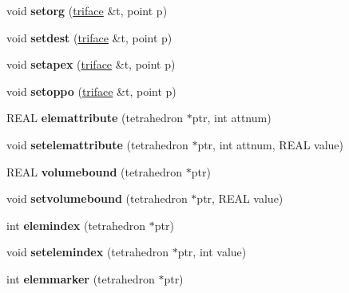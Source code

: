 \begin{DoxyCompactItemize}
void {\bfseries setorg} (\hyperlink{classtetgenmesh_1_1triface}{triface} \&t, point p)
\item 
\mbox{\label{classtetgenmesh_a0fe745e12c7d0ce253a8d4486992ed7e}} 
void {\bfseries setdest} (\hyperlink{classtetgenmesh_1_1triface}{triface} \&t, point p)
\item 
\mbox{\label{classtetgenmesh_a0f00b784db4aba3d5d3f7c7b09ed12dc}} 
void {\bfseries setapex} (\hyperlink{classtetgenmesh_1_1triface}{triface} \&t, point p)
\item 
\mbox{\label{classtetgenmesh_abb76d76639d4f8cedc41c86d6fa2f180}} 
void {\bfseries setoppo} (\hyperlink{classtetgenmesh_1_1triface}{triface} \&t, point p)
\item 
\mbox{\label{classtetgenmesh_abffbd551714f2e119e0f8ba3e4e54c92}} 
R\+E\+AL {\bfseries elemattribute} (tetrahedron $\ast$ptr, int attnum)
\item 
\mbox{\label{classtetgenmesh_a0a648fdfb850a6d706e96bf62a18f761}} 
void {\bfseries setelemattribute} (tetrahedron $\ast$ptr, int attnum, R\+E\+AL value)
\item 
\mbox{\label{classtetgenmesh_acbf906f467a4da46e7f89812cef268d7}} 
R\+E\+AL {\bfseries volumebound} (tetrahedron $\ast$ptr)
\item 
\mbox{\label{classtetgenmesh_a33453f3a5320ecc48f25630a97c5e353}} 
void {\bfseries setvolumebound} (tetrahedron $\ast$ptr, R\+E\+AL value)
\item 
\mbox{\label{classtetgenmesh_a0a12e21d9d363bc5aef59c1b1e51e5f2}} 
int {\bfseries elemindex} (tetrahedron $\ast$ptr)
\item 
\mbox{\label{classtetgenmesh_a2cbb9d3c9692a5769ad8e9f20263a3ad}} 
void {\bfseries setelemindex} (tetrahedron $\ast$ptr, int value)
\item 
\mbox{\label{classtetgenmesh_aea9c7e2e0f281f543c9215dcf4694512}} 
int {\bfseries elemmarker} (tetrahedron $\ast$ptr)
\item 

\end{DoxyCompactItemize}
